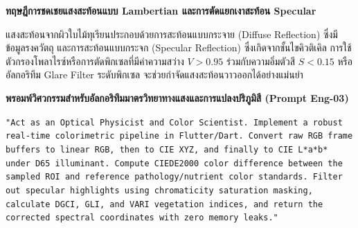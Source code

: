 \begin{theorybox}
\textbf{ทฤษฎีการชดเชยแสงสะท้อนแบบ Lambertian และการตัดแยกเงาสะท้อน Specular}\par
แสงสะท้อนจากผิวใบไม้ทุเรียนประกอบด้วยการสะท้อนแบบกระจาย (Diffuse Reflection) ซึ่งมีข้อมูลรงควัตถุ และการสะท้อนแบบกระจก (Specular Reflection) ซึ่งเกิดจากชั้นไขคิวติเคิล การใช้ตัวกรองโพลาไรซ์หรือการตัดพิกเซลที่มีค่าความสว่าง $V > 0.95$ ร่วมกับความอิ่มตัวสี $S < 0.15$ หรืออัลกอริทึม Glare Filter ระดับพิกเซล จะช่วยกำจัดแสงสะท้อนวาวออกได้อย่างแม่นยำ
\end{theorybox}

\begin{promptbox}
\textbf{พรอมพ์วิศวกรรมสำหรับอัลกอริทึมมาตรวิทยาทางแสงและการแปลงปริภูมิสี (Prompt Eng-03)}\par
\texttt{"Act as an Optical Physicist and Color Scientist. Implement a robust real-time colorimetric pipeline in Flutter/Dart. Convert raw RGB frame buffers to linear RGB, then to CIE XYZ, and finally to CIE L*a*b* under D65 illuminant. Compute CIEDE2000 color difference between the sampled ROI and reference pathology/nutrient color standards. Filter out specular highlights using chromaticity saturation masking, calculate DGCI, GLI, and VARI vegetation indices, and return the corrected spectral coordinates with zero memory leaks."}
\end{promptbox}
